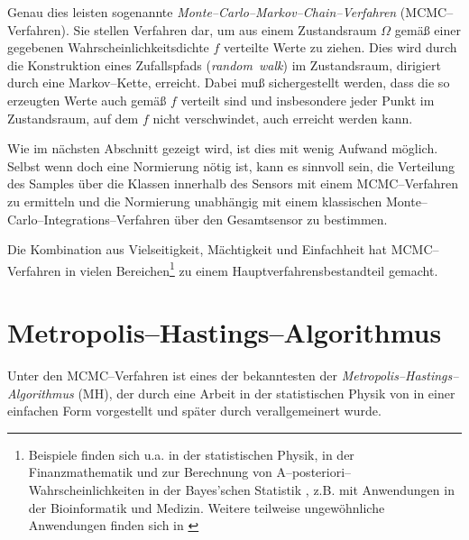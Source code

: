 	Genau dies leisten sogenannte {\em Mon\-te--Car\-lo--Mar\-kov--Chain--Ver\-fahr\-en} (MCMC--Verfahren). Sie stellen Verfahren dar, um aus einem Zustandsraum $\Omega$ gemäß einer gegebenen Wahrscheinlichkeitsdichte $f$ verteilte Werte zu ziehen. Dies wird durch die Konstruktion eines Zufallspfads ({\em random~walk}) im Zustandsraum, dirigiert durch eine Markov--Kette, erreicht. Dabei muß sichergestellt werden, dass die so erzeugten Werte auch gemäß $f$ verteilt sind und insbesondere jeder Punkt im Zustandsraum, auf dem $f$ nicht verschwindet, auch erreicht werden kann.
	
	Wie im nächsten Abschnitt gezeigt wird, ist dies mit wenig Aufwand möglich. Selbst wenn doch eine Normierung nötig ist, kann es sinnvoll sein, die Verteilung des Samples über die Klassen innerhalb des Sensors mit einem MCMC--Verfahren zu ermitteln und die Normierung unabhängig mit einem klassischen Monte--Carlo--Integrations--Verfahren über den Gesamtsensor zu bestimmen.
	
	Die Kombination aus Vielseitigkeit, Mächtigkeit und Einfachheit hat MCMC--Verfahren in vielen Bereichen\footnote{Beispiele finden sich u.a. in der statistischen Physik, in der Finanzmathematik und zur Berechnung von A--posteriori--Wahrscheinlichkeiten in der Bayes'schen Statistik \citep{Geweke:1989p10465}, z.B. mit Anwendungen in der Bioinformatik und Medizin. Weitere teilweise ungewöhnliche Anwendungen finden sich in \citep{Diaconis:2009p4122}} zu einem Hauptverfahrensbestandteil gemacht.
	
	
	\section{Metropolis--Hastings--Algorithmus}
	Unter den MCMC--Verfahren ist eines der bekanntesten der {\em Metropolis--Hastings--Algorithmus} (MH), der durch eine Arbeit in der statistischen Physik von \citet{Metropolis:1953p3364} in einer einfachen Form vorgestellt und später durch \citet{Hastings:1970p3387} verallgemeinert wurde.

